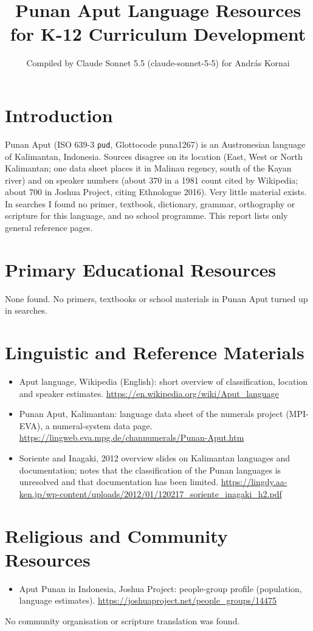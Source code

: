 \documentclass[12pt]{article}
\title{Punan Aput Language Resources for K-12 Curriculum Development}
\author{Compiled by Claude Sonnet 5.5 (claude-sonnet-5-5) for Andr\'as Kornai}
\date{}
\begin{document}
\maketitle

\section{Introduction}
Punan Aput (ISO 639-3 \texttt{pud}, Glottocode puna1267) is an Austronesian language of Kalimantan, Indonesia. Sources disagree on its location (East, West or North Kalimantan; one data sheet places it in Malinau regency, south of the Kayan river) and on speaker numbers (about 370 in a 1981 count cited by Wikipedia; about 700 in Joshua Project, citing Ethnologue 2016). Very little material exists. In searches I found no primer, textbook, dictionary, grammar, orthography or scripture for this language, and no school programme. This report lists only general reference pages.

\section{Primary Educational Resources}
None found. No primers, textbooks or school materials in Punan Aput turned up in searches.

\section{Linguistic and Reference Materials}
\begin{itemize}
\item Aput language, Wikipedia (English): short overview of classification, location and speaker estimates. \url{https://en.wikipedia.org/wiki/Aput_language}
\item Punan Aput, Kalimantan: language data sheet of the numerals project (MPI-EVA), a numeral-system data page. \url{https://lingweb.eva.mpg.de/channumerals/Punan-Aput.htm}
\item Soriente and Inagaki, 2012 overview slides on Kalimantan languages and documentation; notes that the classification of the Punan languages is unresolved and that documentation has been limited. \url{https://lingdy.aa-ken.jp/wp-content/uploads/2012/01/120217_soriente_inagaki_h2.pdf}
\end{itemize}

\section{Religious and Community Resources}
\begin{itemize}
\item Aput Punan in Indonesia, Joshua Project: people-group profile (population, language estimates). \url{https://joshuaproject.net/people_groups/14475}
\end{itemize}
No community organisation or scripture translation was found.
\end{document}

